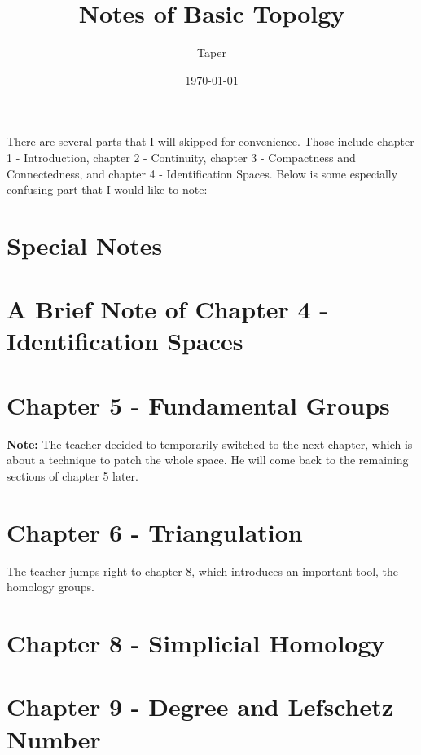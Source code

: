 \documentclass{article}
\title{Notes of Basic Topolgy}
\date{\today}
\author{Taper}
\begin{document}
\maketitle
{}
\tableofcontents
There are several parts that I will skipped for convenience. Those
include chapter 1 - Introduction, chapter 2 - Continuity, chapter 3 -
Compactness and Connectedness, and chapter 4 - Identification Spaces.
Below is some especially confusing part that I would like to note:

\section{Special Notes}
\label{sec:Special-Notes}


\section{A Brief Note of Chapter 4 - Identification Spaces}
\label{sec:Brief-Note-Chapter-4}


\section{Chapter 5 - Fundamental Groups}
\label{sec:Chapter-5-Fundamental-Groups}


\textbf{Note:} The teacher decided to temporarily switched to the next
chapter, which is about a technique to patch the whole space. He will
come back to the remaining sections of chapter 5 later.

\section{Chapter 6 - Triangulation}
\label{sec:Chapter6-Triangulation}


The teacher jumps right to chapter 8, which introduces an important
tool, the homology groups.

\section{Chapter 8 - Simplicial Homology}
\label{sec:Simplicial-Homology}


\section{Chapter 9 - Degree and Lefschetz Number}
\label{sec:Degree-and-Lefschetz-Number}

\end{document}
